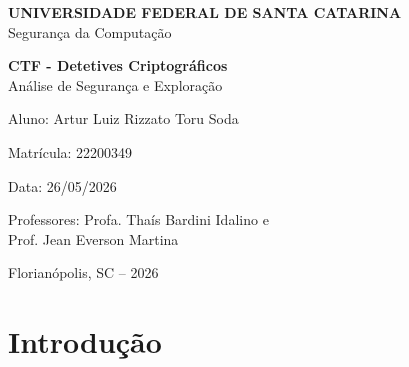 \documentclass[12pt,a4paper]{article}
\begin{document}

\begin{titlepage}
    \centering
    \vspace*{3cm}
    
    {\Large \textbf{UNIVERSIDADE FEDERAL DE SANTA CATARINA}} \\
    \vspace{1cm}
    {\Large Segurança da Computação} \\
    
    \vspace{3cm}
    
    {\LARGE \textbf{CTF - Detetives Criptográficos}} \\
    \vspace{0.5cm}
    {\large Análise de Segurança e Exploração}
    
    \vspace{4cm}
    
    {\large Aluno: Artur Luiz Rizzato Toru Soda}
    
    \vspace{0.5cm}
    {\large Matrícula: 22200349}
    
    \vspace{0.5cm}
    {\large Data: 26/05/2026}
    
    \vspace{0.5cm}
    {\large Professores: Profa. Thaís Bardini Idalino e \\ Prof. Jean Everson Martina}

    \vspace{\fill}
    
    Florianópolis, SC -- 2026
    
\end{titlepage}


\tableofcontents
\newpage


\section{Introdução}
\end{document}
